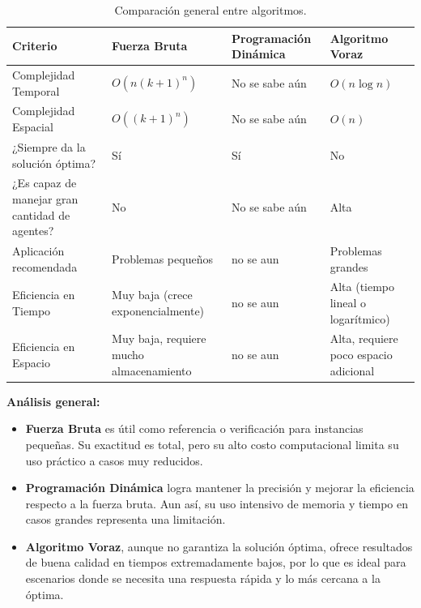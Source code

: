 \documentclass[11pt,letter]{article}
\begin{document}
    \begin{table}[H]
        \centering
        \renewcommand{\arraystretch}{1.5}
        \begin{tabular}{C{4cm} C{3cm} C{3.5cm} C{3.5cm}}
            \toprule
            \textbf{Criterio}                              & \textbf{Fuerza Bruta}                   & \textbf{Programación Dinámica} & \textbf{Algoritmo Voraz}              \\
            \midrule
            Complejidad Temporal                           & \( O(n(k+1)^n) \)                       & No se sabe aún                 & \( O(n \log n) \)                     \\
            Complejidad Espacial                           & \( O((k+1)^n) \)                        & No se sabe aún                 & \( O(n) \)                            \\
            ¿Siempre da la solución óptima?                & Sí                                      & Sí                             & No                                    \\
            ¿Es capaz de manejar gran cantidad de agentes? & No                                      & No se sabe aún                 & Alta                                  \\
            Aplicación recomendada                         & Problemas pequeños                      & no se aun                      & Problemas grandes                     \\
            Eficiencia en Tiempo                           & Muy baja (crece exponencialmente)       & no se aun                      & Alta (tiempo lineal o logarítmico)    \\
            Eficiencia en Espacio                          & Muy baja, requiere mucho almacenamiento & no se aun                      & Alta, requiere poco espacio adicional \\
            \bottomrule
        \end{tabular}
        \caption{Comparación general entre algoritmos.}
    \end{table}

    \textbf{Análisis general:}
    \begin{itemize}
        \item \textbf{Fuerza Bruta} es útil como referencia o verificación para instancias pequeñas. Su exactitud es total, pero su alto costo computacional limita su uso práctico a casos muy reducidos.
        \item \textbf{Programación Dinámica} logra mantener la precisión y mejorar la eficiencia respecto a la fuerza bruta. Aun así, su uso intensivo de memoria y tiempo en casos grandes representa una limitación.
        \item \textbf{Algoritmo Voraz}, aunque no garantiza la solución óptima, ofrece resultados de buena calidad en tiempos extremadamente bajos, por lo que es ideal para escenarios donde se necesita una respuesta rápida y lo más cercana a la óptima.
    \end{itemize}
\end{document}
